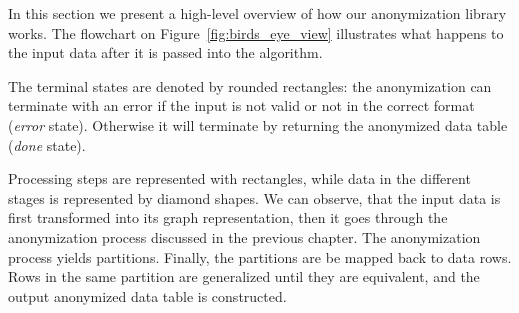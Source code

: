 In this section we present a high-level overview of how our anonymization library works.
The flowchart on Figure~\ref{fig:birds_eye_view} illustrates what happens to the input data after it is passed into the algorithm.

The terminal states are denoted by rounded rectangles: the anonymization can terminate with an error if the input is not valid or not in the correct format (\emph{error} state).
Otherwise it will terminate by returning the anonymized data table (\emph{done} state).

Processing steps are represented with rectangles, while data in the different stages is represented by diamond shapes.
We can observe, that the input data is first transformed into its graph representation, then it goes through the anonymization process discussed in the previous chapter.
The anonymization process yields partitions.
Finally, the partitions are be mapped back to data rows. Rows in the same partition are generalized until they are equivalent, and the output anonymized data table is constructed.

\vspace{\baselineskip}
